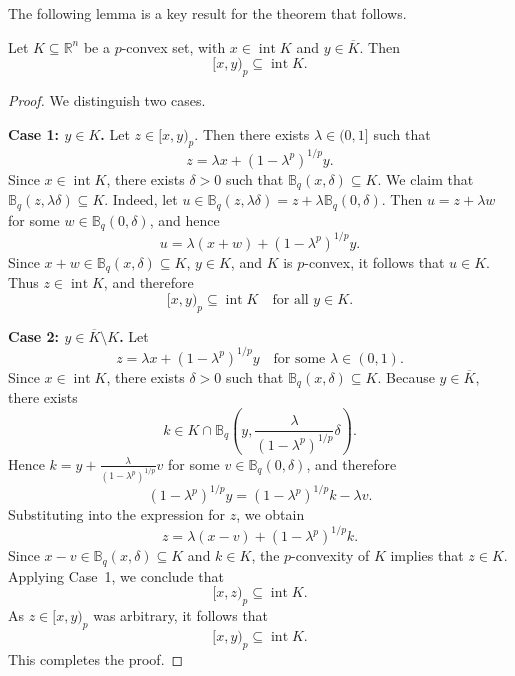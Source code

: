 \documentclass[10pt]{article}
\begin{document}
The following lemma is a key result for the theorem that follows.
\begin{lemma}
Let $K \subseteq \mathbb{R}^{n}$ be a $p$-convex set, with
$x \in \operatorname{int} K$ and $y \in \overline{K}$. Then
\[
[x,y)_{p} \subseteq \operatorname{int} K.
\]
\label{trazo p convexo}
\end{lemma}

\begin{proof}
We distinguish two cases.

\medskip
\noindent\textbf{Case 1: $y \in K$.}
Let $z \in [x,y)_{p}$. Then there exists $\lambda \in (0,1]$ such that
\[
z = \lambda x + (1-\lambda^{p})^{1/p} y.
\]
Since $x \in \operatorname{int} K$, there exists $\delta > 0$ such that
$\mathbb{B}_{q}(x,\delta) \subseteq K$.
We claim that $\mathbb{B}_{q}(z,\lambda\delta) \subseteq K$.
Indeed, let $u \in \mathbb{B}_{q}(z,\lambda\delta)
= z + \lambda \mathbb{B}_{q}(0,\delta)$.
Then $u = z + \lambda w$ for some $w \in \mathbb{B}_{q}(0,\delta)$, and hence
\[
u = \lambda(x+w) + (1-\lambda^{p})^{1/p} y.
\]
Since $x+w \in \mathbb{B}_{q}(x,\delta) \subseteq K$, $y \in K$, and $K$ is
$p$-convex, it follows that $u \in K$.
Thus $z \in \operatorname{int} K$, and therefore
\[
[x,y)_{p} \subseteq \operatorname{int} K \quad \text{for all } y \in K.
\]

\medskip
\noindent\textbf{Case 2: $y \in \overline{K} \setminus K$.}
Let
\[
z = \lambda x + (1-\lambda^{p})^{1/p} y
\quad \text{for some } \lambda \in (0,1).
\]
Since $x \in \operatorname{int} K$, there exists $\delta > 0$ such that
$\mathbb{B}_{q}(x,\delta) \subseteq K$.
Because $y \in \overline{K}$, there exists
\[
k \in K \cap \mathbb{B}_{q}\!\left(
y, \frac{\lambda}{(1-\lambda^{p})^{1/p}}\delta \right).
\]
Hence $k = y + \frac{\lambda}{(1-\lambda^{p})^{1/p}} v$ for some
$v \in \mathbb{B}_{q}(0,\delta)$, and therefore
\[
(1-\lambda^{p})^{1/p} y
= (1-\lambda^{p})^{1/p} k - \lambda v.
\]
Substituting into the expression for $z$, we obtain
\[
z = \lambda(x-v) + (1-\lambda^{p})^{1/p} k.
\]
Since $x-v \in \mathbb{B}_{q}(x,\delta) \subseteq K$ and $k \in K$, the
$p$-convexity of $K$ implies that $z \in K$.
Applying Case~1, we conclude that
\[
[x,z)_{p} \subseteq \operatorname{int} K.
\]
As $z \in [x,y)_{p}$ was arbitrary, it follows that
\[
[x,y)_{p} \subseteq \operatorname{int} K.
\]
This completes the proof.
\end{proof}
\end{document}
